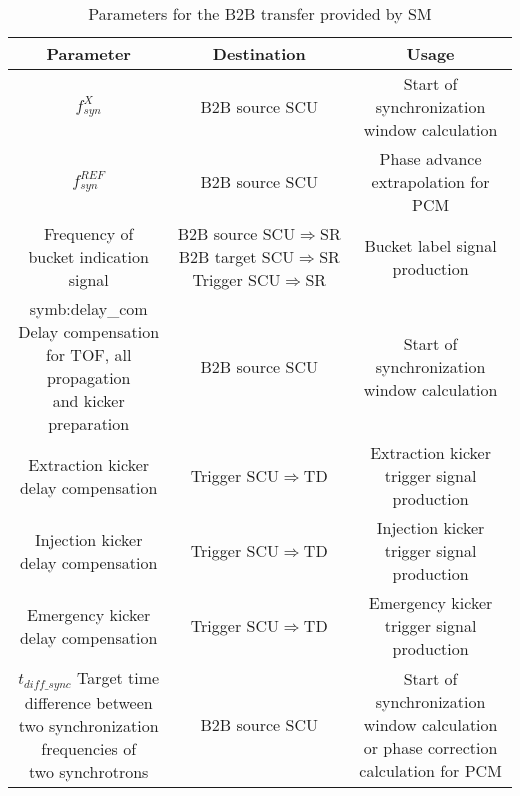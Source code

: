 \label{parameter_SM}
\begin{landscape} 
\begin{table}[!htb]

\caption{Parameters for the B2B transfer provided by SM}
\label{requirement}
\begin{center}
    \begin{tabular}{ | c | c | c |}
    \hline
\rowcolor[gray]{0.5}
     	Parameter &Destination & Usage  \\ \hline
$f_{\mathit{syn}}^X $							&	B2B source SCU	&	Start of synchronization window calculation\\ \hline
$f_{\mathit{syn}}^\mathit{REF} 	$			&	B2B source SCU	&	Phase advance extrapolation for PCM	\\ \hline
\tabincell{c}{Frequency of\\ bucket indication signal} 			&	\tabincell{c}{B2B source SCU$\Rightarrow$SR\\B2B target SCU$\Rightarrow$SR\\Trigger SCU$\Rightarrow$SR}& Bucket label signal production\\ \hline
\tabincell{c}{\gls{symb:delay_com} Delay compensation\\ for TOF, all propagation\\ and kicker preparation}	&	B2B source SCU	& Start of synchronization window calculation\\ \hline
\tabincell{c}{Extraction kicker \\delay compensation}&		Trigger SCU$\Rightarrow$TD			&Extraction kicker trigger signal production	\\ \hline
\tabincell{c}{Injection kicker \\delay compensation} &		Trigger SCU$\Rightarrow$TD			&Injection kicker trigger signal production\\ \hline
\tabincell{c}{Emergency kicker \\delay compensation} &		Trigger SCU$\Rightarrow$TD			&Emergency kicker trigger signal production\\ \hline
$t_{\mathit{diff\_sync}}$ \tabincell{c}{Target time \\difference between\\ two synchronization \\frequencies of\\ two synchrotrons}							&		B2B source SCU	&\tabincell{c}{Start of synchronization window calculation \\ or phase correction calculation for PCM} \\ \hline

\end{tabular}
\end{center}
\end{table}
\end{landscape}

